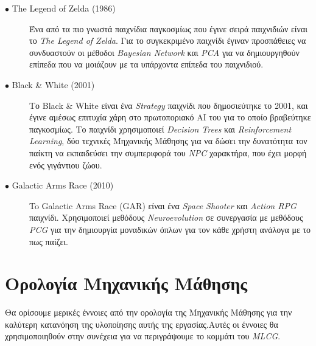 \begin{description}

\item[$\bullet$ The Legend of Zelda (1986)] Ένα από τα πιο γνωστά παιχνίδια παγκοσμίως που έγινε σειρά παιχνιδιών είναι το \textit{The Legend of Zelda}. Για το συγκεκριμένο παιχνίδι έγιναν προσπάθειες να συνδυαστούν οι μέθοδοι \textit{Bayesian Network} και \textit{PCA} για να δημιουργηθούν επίπεδα που να μοιάζουν με τα υπάρχοντα επίπεδα του παιχνιδιού. \cite{legofzelda}

\item[$\bullet$ Black \& White (2001)] Το Black \& White είναι ένα \textit{Strategy} παιχνίδι που δημοσιεύτηκε το 2001, και έγινε αμέσως επιτυχία χάρη στο πρωτοποριακό AI του για το οποίο βραβεύτηκε παγκοσμίως. Το παιχνίδι χρησιμοποιεί \textit{Decision Trees} και \textit{Reinforcement Learning}, δύο τεχνικές Μηχανικής Μάθησης για να δώσει την δυνατότητα τον παίκτη να εκπαιδεύσει την συμπεριφορά του \textit{NPC} χαρακτήρα, που έχει μορφή ενός γιγάντιου ζώου. \cite{bandw}

\item[$\bullet$ Galactic Arms Race (2010)] To Galactic Arms Race (GAR) είναι ένα \textit{Space Shooter} και \textit{Action RPG} παιχνίδι. Χρησιμοποιεί μεθόδους \textit{Neuroevolution} σε συνεργασία με μεθόδους \textit{PCG} για την δημιουργία μοναδικών όπλων για τον κάθε χρήστη ανάλογα με το πως παίζει. \cite{bandw}


\end{description}


\section{Ορολογία Μηχανικής Μάθησης}
Θα ορίσουμε μερικές έννοιες από την ορολογία της Μηχανικής Μάθησης για την καλύτερη κατανόηση της υλοποίησης αυτής της εργασίας.Αυτές οι έννοιες θα χρησιμοποιηθούν στην συνέχεια για να περιγράψουμε το κομμάτι του \textit{MLCG}.


